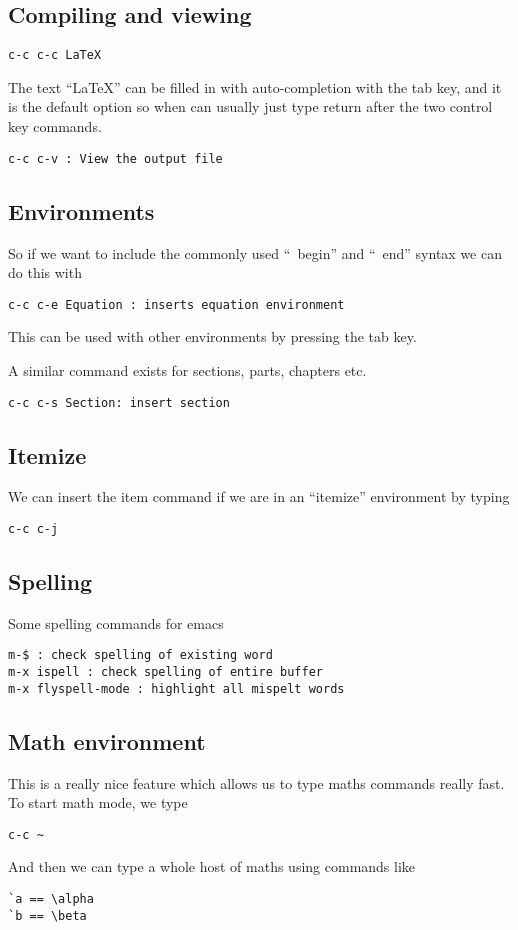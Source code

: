 \documentclass[a4paper, 10pt]{article}
\begin{document}
\subsection*{Compiling and viewing}
\begin{verbatim}
c-c c-c LaTeX
\end{verbatim}
The text ``LaTeX'' can be filled in with auto-completion with the tab key, and it is the default option so when can usually just type return after the two control key commands.
\begin{verbatim}
c-c c-v : View the output file
\end{verbatim}

\subsection*{Environments}

So if we want to include the commonly used ``\ begin{}'' and ``\ end{}'' syntax we can do this with 
\begin{verbatim}
c-c c-e Equation : inserts equation environment
\end{verbatim}
This can be used with other environments by pressing the tab key.

A similar command exists for sections, parts, chapters etc.
\begin{verbatim}
c-c c-s Section: insert section  
\end{verbatim}

\subsection{Itemize}
\label{sec:itemize}


We can insert the item command if we are in an ``itemize'' environment
by typing
\begin{verbatim}
c-c c-j
\end{verbatim}


\subsection{Spelling}
\label{sec:spelling}

Some spelling commands for emacs
\begin{verbatim}
m-$ : check spelling of existing word
m-x ispell : check spelling of entire buffer
m-x flyspell-mode : highlight all mispelt words
\end{verbatim}

\subsection*{Math environment}
This is a really nice feature which allows us to type maths commands really fast. To start math mode, we type
\begin{verbatim}
c-c ~
\end{verbatim}
And then we can type a whole host of maths using commands like
\begin{verbatim}
`a == \alpha
`b == \beta
\end{verbatim}
\end{document}
